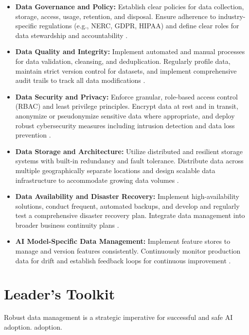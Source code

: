 \begin{itemize}
    \item \textbf{Data Governance and Policy:} Establish clear policies for data collection, storage, access, usage, retention, and disposal. Ensure adherence to industry-specific regulations (e.g., NERC, GDPR, HIPAA) and define clear roles for data stewardship and accountability \parencite{NIST2020DataManagement}.
    \item \textbf{Data Quality and Integrity:} Implement automated and manual processes for data validation, cleansing, and deduplication. Regularly profile data, maintain strict version control for datasets, and implement comprehensive audit trails to track all data modifications \parencite{HPE2023}.
    \item \textbf{Data Security and Privacy:} Enforce granular, role-based access control (RBAC) and least privilege principles. Encrypt data at rest and in transit, anonymize or pseudonymize sensitive data where appropriate, and deploy robust cybersecurity measures including intrusion detection and data loss prevention \parencite{EWsolutions2023}.
    \item \textbf{Data Storage and Architecture:} Utilize distributed and resilient storage systems with built-in redundancy and fault tolerance. Distribute data across multiple geographically separate locations and design scalable data infrastructure to accommodate growing data volumes \parencite{Komprise2023}.
    \item \textbf{Data Availability and Disaster Recovery:} Implement high-availability solutions, conduct frequent, automated backups, and develop and regularly test a comprehensive disaster recovery plan. Integrate data management into broader business continuity plans \parencite{NomaSecurity2023}.
    \item \textbf{AI Model-Specific Data Management:} Implement feature stores to manage and version features consistently. Continuously monitor production data for drift and establish feedback loops for continuous improvement \parencite{Lumenalta2023}.
\end{itemize}

\section{Leader's Toolkit}
\label{sec:data_leaders_toolkit}

Robust data management is a strategic imperative for successful and safe AI adoption.
 adoption.
